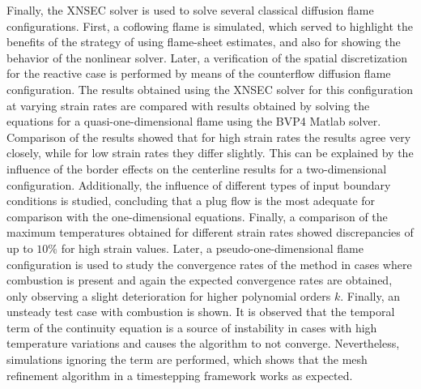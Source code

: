 Finally, the XNSEC solver is used to solve several classical diffusion flame configurations. First, a coflowing flame is simulated, which served to highlight the benefits of the strategy of using flame-sheet estimates, and also for showing the behavior of the nonlinear solver. Later, a verification of the spatial discretization for the reactive case is performed by means of the counterflow diffusion flame configuration. The results obtained using the XNSEC solver for this configuration at varying strain rates are compared with results obtained by solving the equations for a quasi-one-dimensional flame using the BVP4 Matlab solver. Comparison of the results showed that for high strain rates the results agree very closely, while for low strain rates they differ slightly. This can be explained by the influence of the border effects on the centerline results for a two-dimensional configuration. Additionally, the influence of different types of input boundary conditions is studied, concluding that a plug flow is the most adequate for comparison with the one-dimensional equations. Finally, a comparison of the maximum temperatures obtained for different strain rates showed discrepancies of up to $10\%$ for high strain values. Later, a pseudo-one-dimensional flame configuration is used to study the convergence rates of the method in cases where combustion is present and again the expected convergence rates are obtained, only observing a slight deterioration for higher polynomial orders $k$. Finally, an unsteady test case with combustion is shown. It is observed that the temporal term of the continuity equation is a source of instability in cases with high temperature variations and causes the algorithm to not converge. Nevertheless, simulations ignoring the term are performed, which shows that the mesh refinement algorithm in a timestepping framework works as expected.
\FloatBarrier
